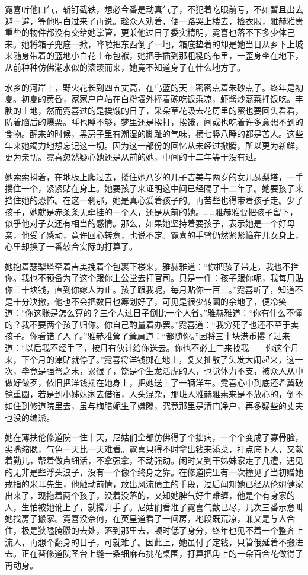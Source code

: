 \par 霓喜听他口气，斩钉截铁，想必今番是动真气了，不犯着吃眼前亏，不如暂且出去避一避，等他明白过来了再说。趁众人劝着，便一路哭上楼去，捡衣服，雅赫雅贵重些的物件都没有交给她掌管，更兼他过日子委实精明，霓喜也落不下多少体己来。她将箱子兜底一掀，哗啦把东西倒了一地，箱底垫着的却是她当日从乡下上城来随身带着的蓝地小白花土布包袱，她把手插到那粗糙的布里，一歪身坐在地下，从前种种仿佛潮水似的滚滚而来，她竟不知道身子在什么地方了。
\par 水乡的河岸上，野火花长到四五丈高，在乌蓝的天上密密点着朱砂点子。终年是初夏。初夏的黄昏，家家户户站在白粉墙外捧着碗吃饭乘凉，虾酱炒蓊菜拌饭吃。丰腴的土地，然而霓喜过的是挨饿的日子，采朵草花吸去花房里的蜜也要回头看看，防着脑后的爆栗。睡也睡不够，梦里还是挨打，挨饿，间或也吃着许多意想不到的食物。醒来的时候，黑房子里有潮湿的脚趾的气味，横七竖八睡的都是苦人。这些年来她竭力地想忘记这一切。因为这一部份的回忆从未经过掀腾，所以更为新鲜，更为亲切。霓喜忽然疑心她还是从前的她，中间的十二年等于没有过。
\par 她索索抖着，在地板上爬过去，搂住她八岁的儿子吉美与两岁的女儿瑟梨塔，一手搂住一个，紧紧贴在身上。她要孩子来证明这中间已经隔了十二年了。她要孩子来挡住她的恐怖。在这一刹那，她是真心爱着孩子的。再苦些也得带着孩子走。少了孩子，她就是赤条条无牵挂的一个人，还是从前的她。……雅赫雅要把孩子留下，似乎他对子女还有相当的感情。那么，如果她坚持着要孩子，表示她是一个好母亲，他受了感动，竟许回心转意，也说不定。霓喜的手臂仍然紧紧箍在儿女身上，心里却换了一番较合实际的打算了。
\par 她抱着瑟梨塔牵着吉美挽着个包裹下楼来，雅赫雅道：“你把孩子带走，我也不拦你。我也不预备为了这个跟你上公堂去打官司。只是一件：孩子跟你呢，我每月贴你三十块钱，直到你嫁人为止。孩子跟我呢，每月贴你一百三。”霓喜听了，知道不是十分决撤，他也不会把数目也筹划好了，可见是很少转圜的余地了，便冷笑道：“你这账是怎么算的？三个人过日子倒比一个人省。”雅赫雅道：“你有什么不懂的？我不要两个孩子归你。你自己酌量着办罢。”霓喜道：“我穷死了也还不至于卖孩子。你看错了人了。”雅赫雅耸了耸肩道：“都随你。”因将三十块港币撂了过来道：“以后我不经手了，按月有伙计给你送去。你也不必上门来找我——你这个月来，下个月的津贴就停了。”霓喜将洋钱掷在地上，复又扯散了头发大闹起来，这一次，毕竟是强弩之末，累很了，饶是个生龙活虎的人，也觉体力不支，被众人从中做好做歹，依旧把洋钱揣在她身上，把她送上了一辆洋车。霓喜心中到底还希冀破镜重圆，若是到小姊妹家去借宿，人头混杂，那班人雅赫雅素来是不放心的，倒不如住到修道院里去，虽与梅腊妮生了嫌隙，究竟那里是清门净户，再多疑些的丈夫也没的编派。
\par 她在薄扶伦修道院一住十天，尼姑们全都仿佛得了个拙病，一个个变成了寡骨脸，尖嘴缩腮，气色一天比一天难看。霓喜只得不时拿出钱来添菜，打点底下人，又献着勤儿，帮着做点细活，不拿强拿，不动强动。闲时又到干姊妹家走了几遭，遇见的无非是些浮头浪子，没有一个像个终身之靠。在修道院里有一次撞见了当初赠她戒指的米耳先生，他触动前情，放出风流债主的手段，过后闻知她已经从伦姆健家出来了，现拖着两个孩子，没着没落的，又知她脾气好生难缠，他是个有身家的人，生怕被她讹上了，就撂开手了。尼姑们看准了霓喜气数已尽，几次三番示意叫她找房子搬家。霓喜没奈何，在英皇道看了一间房，地段既荒凉，兼又是与人合住，极是狭隘腌臜的去处，落到那里去，顿时低了身分，终年也见不着一个整齐上流人，再想个翻身的日子，可就难了。因此上，她虽付了定钱，只管俄延着不搬进去。正在替修道院圣台上缝一条细麻布挑花桌围，打算把角上的一朵百合花做得了再动身。
